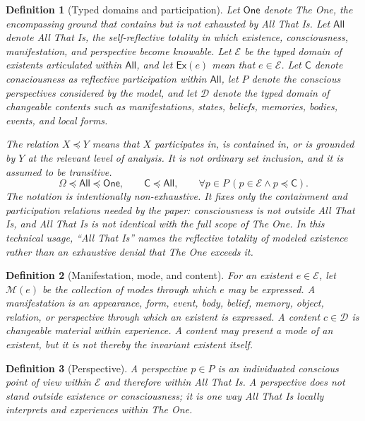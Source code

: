 \documentclass[11pt]{article}
\newtheorem{definition}{Definition}
\newcommand{\Ex}{\mathsf{Ex}}
\newcommand{\One}{\mathsf{One}}
\newcommand{\All}{\mathsf{All}}
\newcommand{\Consc}{\mathsf{C}}
\newcommand{\Ent}{\mathcal{E}}
\newcommand{\Modes}{\mathcal{M}}
\newcommand{\Contents}{\mathcal{D}}
\newcommand{\Ground}{\preceq}
\begin{document}
\begin{definition}[Typed domains and participation]
Let $\One$ denote The One, the encompassing ground that contains but is not exhausted by All That Is.  Let $\All$ denote All That Is, the self-reflective totality in which existence, consciousness, manifestation, and perspective become knowable.  Let $\Ent$ be the typed domain of existents articulated within $\All$, and let $\Ex(e)$ mean that $e\in\Ent$.  Let $\Consc$ denote consciousness as reflective participation within $\All$, let $P$ denote the conscious perspectives considered by the model, and let $\Contents$ denote the typed domain of changeable contents such as manifestations, states, beliefs, memories, bodies, events, and local forms.

The relation $X\Ground Y$ means that $X$ participates in, is contained in, or is grounded by $Y$ at the relevant level of analysis.  It is not ordinary set inclusion, and it is assumed to be transitive.
\[
\Omega\Ground\All\Ground\One,
\qquad
\Consc\Ground\All,
\qquad
\forall p\in P\,(p\in\Ent\wedge p\Ground\Consc).
\]
The notation is intentionally non-exhaustive.  It fixes only the containment and participation relations needed by the paper: consciousness is not outside All That Is, and All That Is is not identical with the full scope of The One.  In this technical usage, ``All That Is'' names the reflective totality of modeled existence rather than an exhaustive denial that The One exceeds it.
\end{definition}

\begin{definition}[Manifestation, mode, and content]
For an existent $e\in\Ent$, let $\Modes(e)$ be the collection of modes through which $e$ may be expressed.  A manifestation is an appearance, form, event, body, belief, memory, object, relation, or perspective through which an existent is expressed.  A content $c\in\Contents$ is changeable material within experience.  A content may present a mode of an existent, but it is not thereby the invariant existent itself.
\end{definition}

\begin{definition}[Perspective]
A perspective $p\in P$ is an individuated conscious point of view within $\Ent$ and therefore within All That Is.  A perspective does not stand outside existence or consciousness; it is one way All That Is locally interprets and experiences within The One.
\end{definition}
\end{document}
